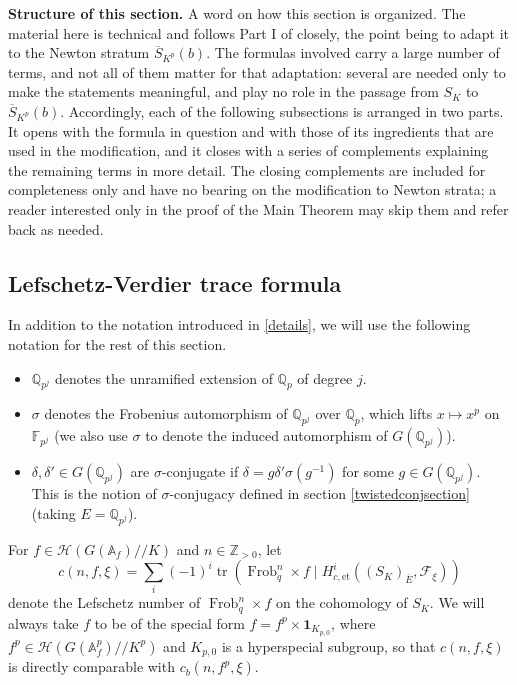 \documentclass[11pt,a4paper]{article}
\theoremstyle{definition}
\theoremstyle{plain}
\theoremstyle{remark}
\theoremstyle{plain}
\DeclareMathOperator{\Frob}{Frob}
\DeclareMathOperator{\tr}{tr}
\begin{document}
\textbf{Structure of this section.} A word on how this section is organized. The material here is technical and follows Part I of \cite{MR1044820} closely, the point being to adapt it to the Newton stratum $\overline{S}_{K^p}(b)$. The formulas involved carry a large number of terms, and not all of them matter for that adaptation: several are needed only to make the statements meaningful, and play no role in the passage from $S_K$ to $\overline{S}_{K^p}(b)$. Accordingly, each of the following subsections is arranged in two parts. It opens with the formula in question and with those of its ingredients that are used in the modification, and it closes with a series of complements explaining the remaining terms in more detail. The closing complements are included for completeness only and have no bearing on the modification to Newton strata; a reader interested only in the proof of the Main Theorem may skip them and refer back as needed.

\subsection{Lefschetz-Verdier trace formula}\label{lvformula}
In addition to the notation introduced in \ref{details}, we will use the following notation for the rest of this section.
\begin{itemize}
    \item $\mathbb{Q}_{p^j}$ denotes the unramified extension of $\mathbb{Q}_p$ of degree $j$.
    \item $\sigma$ denotes the Frobenius automorphism of $\mathbb{Q}_{p^j}$ over $\mathbb{Q}_p$, which lifts $x \mapsto x^p$ on $\mathbb{F}_{p^j}$ (we also use $\sigma$ to denote the induced automorphism of $G(\mathbb{Q}_{p^j})$).
    \item $\delta, \delta' \in G(\mathbb{Q}_{p^j})$ are $\sigma$-conjugate if $\delta = g \delta' \sigma(g^{-1})$ for some $g \in G(\mathbb{Q}_{p^j})$. This is the notion of $\sigma$-conjugacy defined in section \ref{twistedconjsection} (taking $E = \mathbb{Q}_{p^j}$).
\end{itemize}

For $f \in \mathcal{H}(G(\mathbb{A}_f)//K)$ and $n \in \mathbb{Z}_{>0}$, let
$$c(n,f,\xi) = \sum_i (-1)^i \tr(\Frob_q^n \times f \mid H^i_{c,\mathrm{et}}((S_K)_{\overline E}, \mathcal{F}_{\xi}))$$
denote the Lefschetz number of $\Frob_q^n \times f$ on the cohomology of $S_K$. We will always take $f$ to be of the special form $f = f^p \times \mathbf{1}_{K_{p,0}}$, where $f^p \in \mathcal{H}(G(\mathbb{A}_f^p)//K^p)$ and $K_{p,0}$ is a hyperspecial subgroup, so that $c(n,f,\xi)$ is directly comparable with $c_b(n,f^p,\xi)$.
\end{document}
